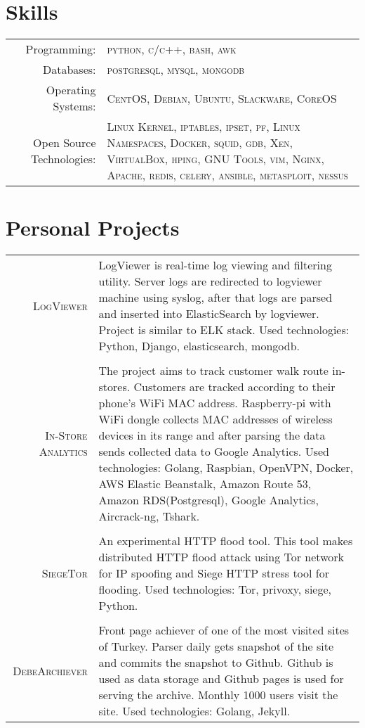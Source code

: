\documentclass[a4paper,10pt]{article}
\begin{document}
\section{Skills}
\begin{tabular}{rp{11cm}}
 Programming:& \textsc{python}, \textsc{c/c++}, \textsc{bash}, \textsc{awk}\\
Databases:& \textsc{postgresql}, \textsc{mysql}, \textsc{mongodb}\\
Operating Systems:&  \textsc{CentOS}, \textsc{Debian}, \textsc{Ubuntu}, \textsc{Slackware},  \textsc{CoreOS}\\
Open Source Technologies:& 
\textsc{Linux Kernel}, \textsc{iptables}, \textsc{ipset}, \textsc{pf},  \textsc{Linux Namespaces}, \textsc{Docker}, \textsc{squid},  \textsc{gdb},  \textsc{Xen},  \textsc{VirtualBox}, \textsc{hping},  \textsc{GNU Tools},  \textsc{vim},  \textsc{Nginx},  \textsc{Apache},  \textsc{redis},  \textsc{celery},  \textsc{ansible},  \textsc{metasploit},  \textsc{nessus} \\

\end{tabular}

\section{Personal Projects}
\begin{tabular}{r|p{11cm}}
\textsc{LogViewer} & \footnotesize{
LogViewer is real-time log viewing and filtering utility. Server logs are redirected to logviewer machine using syslog, after that logs are parsed and inserted into ElasticSearch by logviewer. Project is similar to ELK stack. Used technologies: Python, Django, elasticsearch, mongodb.
}\\\multicolumn{2}{c}{} \\
\textsc{In-Store Analytics} & \footnotesize{The project aims to track customer walk route in-stores. Customers are tracked according to their phone's WiFi MAC address. Raspberry-pi with WiFi dongle collects MAC addresses of wireless devices in its range and after parsing the data sends collected data to Google Analytics. Used technologies: Golang, Raspbian, OpenVPN, Docker, AWS Elastic Beanstalk, Amazon Route 53, Amazon RDS(Postgresql), Google Analytics, Aircrack-ng, Tshark.
}\\\multicolumn{2}{c}{} \\
\textsc{SiegeTor} & \footnotesize{An experimental HTTP flood tool. This tool makes distributed HTTP flood attack using Tor network for IP spoofing and Siege HTTP stress tool for flooding.  Used technologies: Tor, privoxy, siege, Python.
}\\\multicolumn{2}{c}{} \\
\textsc{DebeArchiever} & \footnotesize{Front page achiever of one of the most visited sites of Turkey. Parser daily gets snapshot of the site and commits the snapshot to Github. Github is used as data storage and Github pages is used for serving the archive. Monthly 1000 users visit the site. Used technologies: Golang, Jekyll. 
} \\
\end{tabular}
\end{document}
